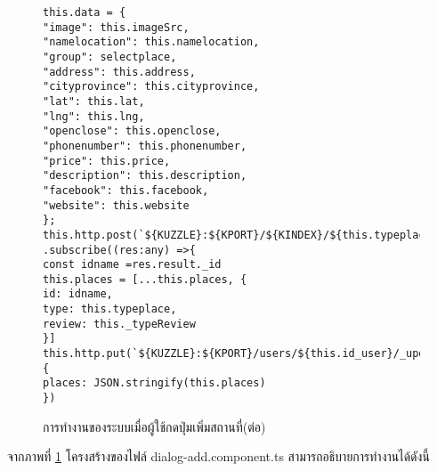 \begin{figure}[H]
{\lstset{language=Pascal}
\begin{lstlisting}
this.data = {
"image": this.imageSrc,
"namelocation": this.namelocation,
"group": selectplace,
"address": this.address,
"cityprovince": this.cityprovince,
"lat": this.lat,
"lng": this.lng,
"openclose": this.openclose,
"phonenumber": this.phonenumber,
"price": this.price,
"description": this.description,
"facebook": this.facebook,
"website": this.website
};
this.http.post(`${KUZZLE}:${KPORT}/${KINDEX}/${this.typeplace}/_create`,this.data)
.subscribe((res:any) =>{
const idname =res.result._id
this.places = [...this.places, {
id: idname,
type: this.typeplace,
review: this._typeReview
}]
this.http.put(`${KUZZLE}:${KPORT}/users/${this.id_user}/_update`, {
places: JSON.stringify(this.places)
})
\end{lstlisting}}
\caption{การทำงานของระบบเมื่อผู้ใช้กดปุ่มเพิ่มสถานที่(ต่อ)}
\label{Fig:4-addplace2}
\end{figure}
\newpage
จากภาพที่ \ref{Fig:4-addplace2} โครงสร้างของไฟล์ dialog-add.component.ts สามารถอธิบายการทำงานได้ดังนี้
